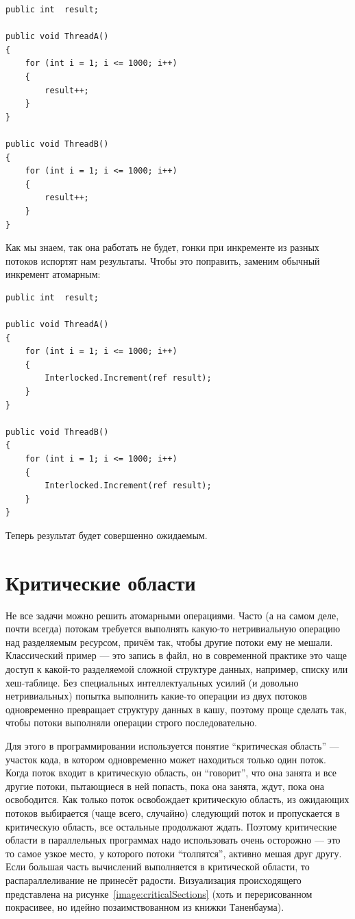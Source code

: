 \documentclass{../../text-style}
\begin{document}
\begin{verbatim}
public int  result;

public void ThreadA()
{
    for (int i = 1; i <= 1000; i++) 
    {
        result++;
    }
}

public void ThreadB()
{
    for (int i = 1; i <= 1000; i++) 
    {
        result++; 
    }
}
\end{verbatim}

Как мы знаем, так она работать не будет, гонки при инкременте из разных потоков испортят нам результаты. Чтобы это поправить, заменим обычный инкремент атомарным:

\begin{verbatim}
public int  result;

public void ThreadA()
{
    for (int i = 1; i <= 1000; i++) 
    {
        Interlocked.Increment(ref result);
    }
}

public void ThreadB()
{
    for (int i = 1; i <= 1000; i++) 
    {
        Interlocked.Increment(ref result); 
    }
}
\end{verbatim}

Теперь результат будет совершенно ожидаемым.

\section{Критические области}

Не все задачи можно решить атомарными операциями. Часто (а на самом деле, почти всегда) потокам требуется выполнять какую-то нетривиальную операцию над разделяемым ресурсом, причём так, чтобы другие потоки ему не мешали. Классический пример --- это запись в файл, но в современной практике это чаще доступ к какой-то разделяемой сложной структуре данных, например, списку или хеш-таблице. Без специальных интеллектуальных усилий (и довольно нетривиальных) попытка выполнить какие-то операции из двух потоков одновременно превращает структуру данных в кашу, поэтому проще сделать так, чтобы потоки выполняли операции строго последовательно.

Для этого в программировании используется понятие \enquote{критическая область} --- участок кода,  в котором одновременно может находиться только один поток. Когда поток входит в критическую область, он \enquote{говорит}, что она занята и все другие потоки, пытающиеся в ней попасть, пока она занята, ждут, пока она освободится. Как только поток освобождает критическую область, из ожидающих потоков выбирается (чаще всего, случайно) следующий поток и пропускается в критическую область, все остальные продолжают ждать. Поэтому критические области в параллельных программах надо использовать очень осторожно --- это то самое узкое место, у которого потоки \enquote{толпятся}, активно мешая друг другу. Если большая часть вычислений выполняется в критической области, то распараллеливание не принесёт радости. Визуализация происходящего представлена на рисунке~\ref{image:criticalSections} (хоть и перерисованном покрасивее, но идейно позаимствованном из книжки Таненбаума).
\end{document}
